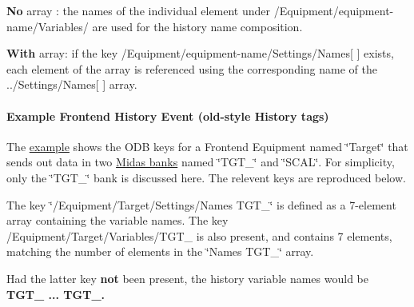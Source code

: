 \begin{DoxyItemize}
\begin{DoxyItemize}
\begin{DoxyItemize}
\item {\bfseries No} array : the names of the individual element under /Equipment/equipment-\/name/Variables/ are used for the history name composition. 
\item {\bfseries With} array: if the key /Equipment/equipment-\/name/Settings/Names\mbox{[} \mbox{]} exists, each element of the array is referenced using the corresponding name of the ../Settings/Names\mbox{[} \mbox{]} array. 
\end{DoxyItemize}
\end{DoxyItemize}
\end{DoxyItemize}\hypertarget{F_History_logging_F_example_FE_history_event}{}\paragraph{Example Frontend History Event (old-\/style History tags)}\label{F_History_logging_F_example_FE_history_event}
The \hyperlink{RC_mhttpd_Equipment_page_RC_mhttpd_Equipment_example4}{example} shows the ODB keys for a Frontend Equipment named \char`\"{}Target\char`\"{} that sends out data in two \hyperlink{FE_bank_construction_FE_MIDAS_event_construction}{Midas banks} named \char`\"{}TGT\_\-\char`\"{} and \char`\"{}SCAL\char`\"{}. For simplicity, only the \char`\"{}TGT\_\-\char`\"{} bank is discussed here. The relevent keys are reproduced below.

\par
The key \char`\"{}/Equipment/Target/Settings/Names TGT\_\-\char`\"{} is defined as a 7-\/element array containing the variable names. The key /Equipment/Target/Variables/TGT\_\- is also present, and contains 7 elements, matching the number of elements in the \char`\"{}Names TGT\_\-\char`\"{} array. \par
 Had the latter key {\bfseries not} been present, the history variable names would be {\bfseries TGT\_ ... TGT\_.} \par
 
